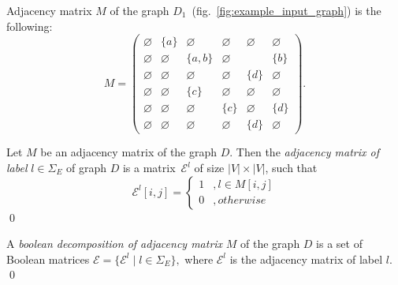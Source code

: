 Adjacency matrix $M$ of the graph $D_1$~(fig.~\ref{fig:example_input_graph}) is the following:
{
    \renewcommand{\arraystretch}{0.7}
    \setlength\arraycolsep{2pt}
$$
    M =
    \begin{pmatrix}
    \varnothing     & \{a\} &   \varnothing      &   \varnothing   &   \varnothing   &   \varnothing   \\
    \varnothing     &   \varnothing   & \{a, b\} &   \varnothing   &       & \{b\} \\
    \varnothing     &   \varnothing   &   \varnothing      &   \varnothing   & \{d\} &   \varnothing   \\
    \varnothing     &   \varnothing   & \{c\}    &   \varnothing   &   \varnothing   &   \varnothing   \\
    \varnothing     &   \varnothing   &   \varnothing      & \{c\} &   \varnothing   & \{d\} \\
    \varnothing     & \varnothing     &   \varnothing      &   \varnothing   & \{d\} &   \varnothing
    \end{pmatrix}.
$$
}

\begin{definition}
Let $M$ be an adjacency matrix of the graph $D$. Then the \emph{adjacency matrix of label} $l \in \Sigma_E$ of graph $D$ is a matrix~$\mathcal{E}^l$ of size  $|V| \times |V|$, such that
\begin{equation*}
\mathcal{E}^l[i,j] =
 \begin{cases}
   1 &, l \in M[i,j]\\
   0 &, otherwise
 \end{cases}
\end{equation*} \qed
\end{definition}

\begin{definition}
A \emph{boolean decomposition of adjacency matrix} $M$ of the graph $D$ is a set of Boolean matrices $\mathcal{E} = \{\mathcal{E}^l \mid l \in \Sigma_E\},$
where $\mathcal{E}^l$ is the adjacency matrix of label $l$. \qed
\end{definition}

